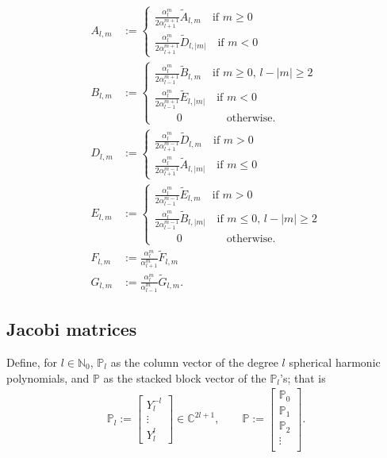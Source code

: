 \documentclass[11pt, oneside]{article}   	%
\newcommand{\C}{\mathbb{C}}
\newcommand{\No}{\mathbb{N}_0}
\newcommand{\alphalm}{\alpha^m_l}
\newcommand{\Atilde}{\tilde{A}_{l,m}}
\newcommand{\Btilde}{\tilde{B}_{l,m}}
\newcommand{\Dtilde}{\tilde{D}_{l,m}}
\newcommand{\Etilde}{\tilde{E}_{l,m}}
\newcommand{\Ftilde}{\tilde{F}_{l,m}}
\newcommand{\Gtilde}{\tilde{G}_{l,m}}
\newcommand{\Alm}{A_{l,m}}
\newcommand{\Blm}{B_{l,m}}
\newcommand{\Dlm}{D_{l,m}}
\newcommand{\Elm}{E_{l,m}}
\newcommand{\Flm}{F_{l,m}}
\newcommand{\Glm}{G_{l,m}}
\newcommand{\bigP}{\mathbb{P}}
\newcommand{\Pl}{\mathbb{P}_l}
\begin{document}
\begin{align}
\Alm &:= \begin{cases}
			\frac{\alphalm}{2\alpha^{m+1}_{l+1}} \Atilde \quad \text{if } m\ge0 \\
			\frac{\alphalm}{2\alpha^{m+1}_{l+1}} \tilde{D}_{l,|m|} \quad \text{if } m<0 
	       \end{cases} \\
\Blm &:= \begin{cases}
			\frac{\alphalm}{2\alpha^{m+1}_{l-1}} \Btilde \quad \text{if } m\ge0, \, l - |m| \ge 2 \\
			\frac{\alphalm}{2\alpha^{m+1}_{l-1}} \tilde{E}_{l,|m|} \quad \text{if } m<0 \\
			\quad \quad 0 \quad \quad \quad \quad \text{otherwise.} 
	        \end{cases} \\
\Dlm &:= \begin{cases}
			\frac{\alphalm}{2\alpha^{m-1}_{l+1}} \Dtilde \quad \text{if } m>0 \\
			\frac{\alphalm}{2\alpha^{m-1}_{l+1}} \tilde{A}_{l,|m|} \quad \text{if } m\le0 
	       \end{cases} \\
\Elm &:= \begin{cases}
			\frac{\alphalm}{2\alpha^{m-1}_{l-1}} \Etilde \quad \text{if } m>0 \\
			\frac{\alphalm}{2\alpha^{m-1}_{l-1}} \tilde{B}_{l,|m|} \quad \text{if } m\le0 , \, l - |m| \ge 2 \\
			\quad \quad 0 \quad \quad \quad \quad \text{otherwise.} 
	        \end{cases} \\ 
\Flm &:= \frac{\alphalm}{\alpha^{m}_{l+1}} \Ftilde \\
\Glm &:= \frac{\alphalm}{\alpha^{m}_{l-1}} \Gtilde.
\end{align}



\subsection{Jacobi matrices}

Define, for \(l \in \No\), \(\Pl\) as the column vector of the degree \(l\) spherical harmonic polynomials, and \(\bigP\) as the stacked block vector of the \(\Pl\)'s; that is
\begin{align}
\Pl := \begin{bmatrix}
		Y^{-l}_l \\
		\vdots \\
		Y^l_l
	\end{bmatrix} \in \C^{2l+1}, 
\quad \quad 
\bigP := \begin{bmatrix}
		\bigP_0 \\
		\hline
		\bigP_1 \\
		\hline
		\bigP_2 \\
		\vdots \\
	\end{bmatrix}.
\end{align}
\end{document}
